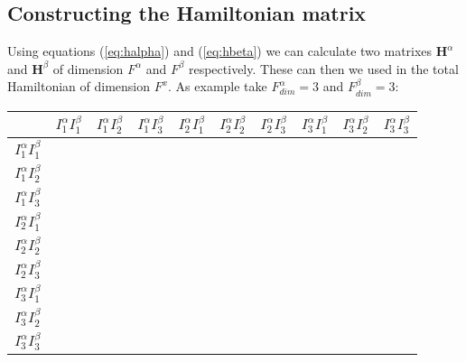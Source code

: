 \subsection{Constructing the Hamiltonian matrix}

Using equations (\ref{eq:halpha}) and (\ref{eq:hbeta}) we can calculate two matrixes $\textbf{H}^\alpha$ and $\textbf{H}^\beta$ of dimension $F^\alpha$ and $F^\beta$ respectively.
These can then we used in the total Hamiltonian of dimension $F^x$. As example take $F_{dim}^\alpha = 3$ and $F_{dim}^\beta = 3$:

\begin{table}[H]
  \begin{center}
\begin{tabular}{|l||l|l|l|l|l|l|l|l|l|}
\hline
 & $I_{1}^{\alpha} I_{1}^{\beta}$ & $I_{1}^{\alpha} I_{2}^{\beta}$  &  $I_{1}^{\alpha} I_{3}^{\beta}$ &  $I_{2}^{\alpha} I_{1}^{\beta}$ & $I_{2}^{\alpha} I_{2}^{\beta}$  &  $I_{2}^{\alpha} I_{3}^{\beta}$ &  $I_{3}^{\alpha} I_{1}^{\beta}$ &  $I_{3}^{\alpha} I_{2}^{\beta}$ & $I_{3}^{\alpha} I_{3}^{\beta}$ \\ \hline \hline
$I_{1}^{\alpha} I_{1}^{\beta}$ &  &  &  &  &  &  &  &  &  \\ \hline
$I_{1}^{\alpha} I_{2}^{\beta}$ &  &  &  &  &  &  &  &  &  \\ \hline
$I_{1}^{\alpha} I_{3}^{\beta}$ &  &  &  &  &  &  &  &  &  \\ \hline
$I_{2}^{\alpha} I_{1}^{\beta}$ &  &  &  &  &  &  &  &  &  \\ \hline
$I_{2}^{\alpha} I_{2}^{\beta}$ &  &  &  &  &  &  &  &  &  \\ \hline
$I_{2}^{\alpha} I_{3}^{\beta}$ &  &  &  &  &  &  &  &  &  \\ \hline
$I_{3}^{\alpha} I_{1}^{\beta}$ &  &  &  &  &  &  &  &  &  \\ \hline
$I_{3}^{\alpha} I_{2}^{\beta}$ &  &  &  &  &  &  &  &  &  \\ \hline
$I_{3}^{\alpha} I_{3}^{\beta}$ &  &  &  &  &  &  &  &  &  \\ \hline
\end{tabular}
\end{center}
\end{table}
